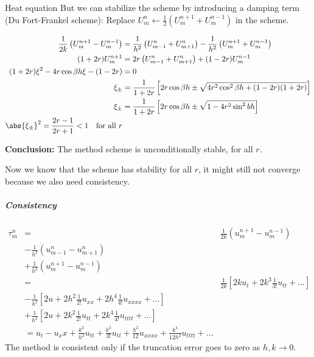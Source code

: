 \begin{example}{Heat equation}{}
  But we can stabilize the scheme by introducing a damping term (Du Fort-Frankel scheme):
  Replace \( U_m^n \leftarrow \frac{1}{2}(U_m^{n+1} + U_m^{n-1}) \) in the scheme.

  \begin{align*}
    \frac{1}{2k}\left( U_m^{n+1} - U_m^{n-1} \right)
     & =
    \frac{1}{h^2}\left( U_{m-1}^n + U_{m+1}^n\right) - \frac{1}{h^2}\left( U_m^{n+1} + U_m^{n-1} \right) \\
    (1 + 2r)U_m^{n+1}
     & =
    2r\left( U_{m-1}^n + U_{m+1}^n \right) + (1 - 2r)U_m^{n-1}                                           \\
    (1 + 2r)\xi^2 - 4r \cos \beta h \xi - (1 - 2r)
     & = 0                                                                                               \\
    \xi_\pm
     & = \frac{1}{1 + 2r} \left[ 2r\cos \beta h \pm \sqrt{4r^2\cos^2 \beta h + (1 - 2r)(1 + 2r)} \right] \\
    \xi_\pm
     & = \frac{1}{1 + 2r} \left[ 2r\cos \beta h \pm \sqrt{1 - 4r^2 \sin^2 {bh}} \right]                  \\
    \abs{\xi_\pm}^2 = \frac{2r - 1}{2r + 1} < 1 \quad \text{for all } r                                  \\
  \end{align*}

  \textbf{Conclusion:} The method scheme is unconditionally stable, for all \( r \).

  Now we know that the scheme has stability for all \( r \), it might still not converge because we also need consistency.

  \subparagraph{Consistency}
  \begin{align*}
    \tau_m^n
     & =
     & \frac{1}{2k}\left( u_m^{n+1} - u_m^{n-1} \right)                                                 \\
     & - \frac{1}{h^2}\left( u_{m-1}^n - u_{m+1}^n \right)                                              \\
     & + \frac{1}{h^2}\left( u_m^{n+1} - u_m^{n-1} \right)                                              \\
     & =
     & \frac{1}{2k}\left[ 2k u_t + 2k^3 \frac{1}{3!}u_{tt} + \ldots \right]                             \\
     & -\frac{1}{h^2}\left[ 2u + 2h^2 \frac{1}{2!}u_{xx} + 2h^4 \frac{1}{4!}u_{xxxx} + \ldots \right]   \\
     & + \frac{1}{h^2}\left[ 2 u + 2k^2 \frac{1}{2!}u_{tt} + 2k^4 \frac{1}{4!}u_{tttt} + \ldots \right] \\
     & =
    u_t - u_xx
    + \frac{k^2}{h^2}u_{tt} + \frac{k^2}{3!}u_{tt}
    + \frac{h^2}{12}u_{xxxx} + \frac{k^4}{12h^2}u_{tttt}
    + \ldots
  \end{align*}
  The method is consistent only if the truncation error goes to zero as \( h, k \to 0 \).


\end{example}
